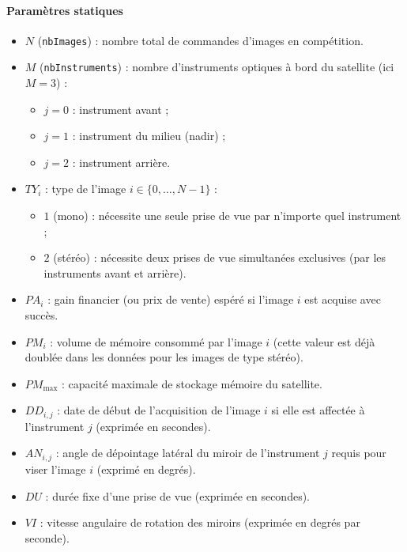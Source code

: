 \documentclass[8pt]{article}
\begin{document}
\paragraph{Paramètres statiques}
\begin{itemize}
    \item \textbf{$N$} (\texttt{nbImages}) : nombre total de commandes d'images en compétition.
    \item \textbf{$M$} (\texttt{nbInstruments}) : nombre d'instruments optiques à bord du satellite (ici $M=3$) :
    \begin{itemize}
        \item $j = 0$ : instrument avant ;
        \item $j = 1$ : instrument du milieu (nadir) ;
        \item $j = 2$ : instrument arrière.
    \end{itemize}
    \item \textbf{$TY_i$} : type de l'image $i \in \{0, \dots, N-1\}$ :
    \begin{itemize}
        \item $1$ (mono) : nécessite une seule prise de vue par n'importe quel instrument ;
        \item $2$ (stéréo) : nécessite deux prises de vue simultanées exclusives (par les instruments avant et arrière).
    \end{itemize}
    \item \textbf{$PA_i$} : gain financier (ou prix de vente) espéré si l'image $i$ est acquise avec succès.
    \item \textbf{$PM_i$} : volume de mémoire consommé par l'image $i$ (cette valeur est déjà doublée dans les données pour les images de type stéréo).
    \item \textbf{$PM_{\max}$} : capacité maximale de stockage mémoire du satellite.
    \item \textbf{$DD_{i,j}$} : date de début de l'acquisition de l'image $i$ si elle est affectée à l'instrument $j$ (exprimée en secondes).
    \item \textbf{$AN_{i,j}$} : angle de dépointage latéral du miroir de l'instrument $j$ requis pour viser l'image $i$ (exprimé en degrés).
    \item \textbf{$DU$} : durée fixe d'une prise de vue (exprimée en secondes).
    \item \textbf{$VI$} : vitesse angulaire de rotation des miroirs (exprimée en degrés par seconde).
\end{itemize}
\end{document}
